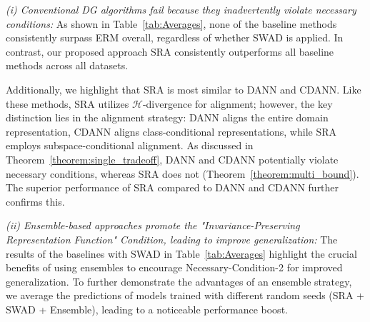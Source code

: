 \textit{(i) Conventional DG algorithms fail because they inadvertently violate necessary conditions:} As shown in Table~\ref{tab:Averages}, none of the baseline methods consistently surpass ERM overall, regardless of whether SWAD is applied. In contrast, our proposed approach SRA consistently outperforms all baseline methods across all datasets.  

Additionally, we highlight that SRA is most similar to DANN and CDANN. Like these methods, SRA utilizes $\mathcal{H}$-divergence for alignment; however, the key distinction lies in the alignment strategy:  DANN aligns the entire domain representation,  CDANN aligns class-conditional representations, while SRA employs subspace-conditional alignment.
As discussed in Theorem~\ref{theorem:single_tradeoff}, DANN and CDANN potentially violate necessary conditions, whereas SRA does not (Theorem~\ref{theorem:multi_bound}). The superior performance of SRA compared to DANN and CDANN further confirms this.


\textit{(ii) Ensemble-based approaches promote the "Invariance-Preserving Representation Function" Condition, leading to improve generalization:} 
The results of the baselines with SWAD in Table~\ref{tab:Averages} highlight the crucial benefits of using ensembles to encourage Necessary-Condition-2 for improved generalization. To further demonstrate the advantages of an ensemble strategy, we average the predictions of models trained with different random seeds (SRA + SWAD + Ensemble), leading to a noticeable performance boost. 


